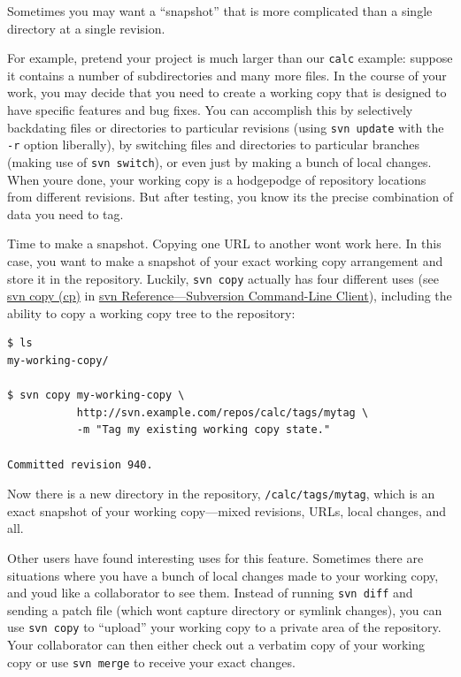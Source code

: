 Sometimes you may want a ``snapshot'' that is more complicated than a
single directory at a single revision.

For example, pretend your project is much larger than our \texttt{calc}
example: suppose it contains a number of subdirectories and many more
files. In the course of your work, you may decide that you need to
create a working copy that is designed to have specific features and bug
fixes. You can accomplish this by selectively backdating files or
directories to particular revisions (using \texttt{svn\ update} with the
\texttt{-r} option liberally), by switching files and directories to
particular branches (making use of \texttt{svn\ switch}), or even just
by making a bunch of local changes. When you\textquotesingle re done,
your working copy is a hodgepodge of repository locations from different
revisions. But after testing, you know it\textquotesingle s the precise
combination of data you need to tag.

Time to make a snapshot. Copying one URL to another
won\textquotesingle t work here. In this case, you want to make a
snapshot of your exact working copy arrangement and store it in the
repository. Luckily, \texttt{svn\ copy} actually has four different uses
(see \hyperref[svn.ref.svn.c.copy]{svn copy (cp)} in
\hyperref[svn.ref.svn]{svn Reference---Subversion Command-Line Client}),
including the ability to copy a working copy tree to the repository:

\begin{verbatim}
$ ls
my-working-copy/

$ svn copy my-working-copy \
           http://svn.example.com/repos/calc/tags/mytag \
           -m "Tag my existing working copy state."

Committed revision 940.
\end{verbatim}

Now there is a new directory in the repository,
\texttt{/calc/tags/mytag}, which is an exact snapshot of your working
copy---mixed revisions, URLs, local changes, and all.

Other users have found interesting uses for this feature. Sometimes
there are situations where you have a bunch of local changes made to
your working copy, and you\textquotesingle d like a collaborator to see
them. Instead of running \texttt{svn\ diff} and sending a patch file
(which won\textquotesingle t capture directory or symlink changes), you
can use \texttt{svn\ copy} to ``upload'' your working copy to a private
area of the repository. Your collaborator can then either check out a
verbatim copy of your working copy or use \texttt{svn\ merge} to receive
your exact changes.

